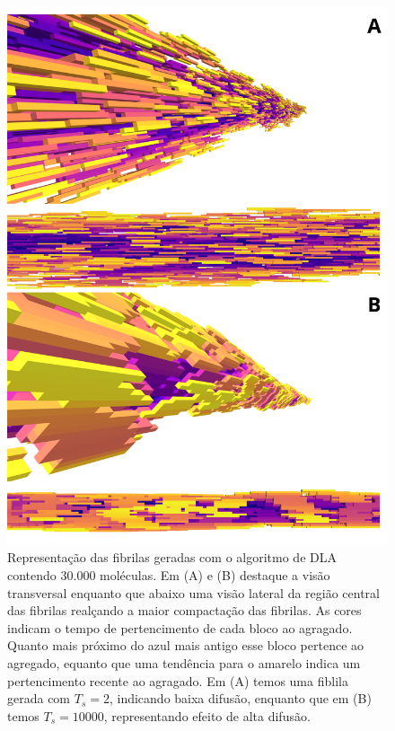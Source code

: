 \documentclass{report}
\begin{document}
        \begin{figure}[H]
            \centering
            \includegraphics[width=\textwidth]{figures/fibrils.png}
    
            \caption{Representação das fibrilas geradas com o algoritmo de DLA contendo $30.000$ moléculas. 
            Em (A) e (B) destaque a visão transversal enquanto que abaixo uma visão lateral da região central
            das fibrilas realçando a maior compactação das fibrilas. As cores indicam 
            o tempo de pertencimento de cada bloco ao agragado. Quanto mais próximo do azul mais antigo esse 
            bloco pertence ao agregado, equanto que uma tendência para o amarelo indica um pertencimento recente 
            ao agragado. Em (A) temos uma fiblila gerada com \(T_{s} = 2\), indicando baixa difusão, enquanto que 
            em (B) temos \(T_{s} = 10000\), representando efeito de alta difusão.} 
    
            \label{R1}
        \end{figure}
    
\end{document}
